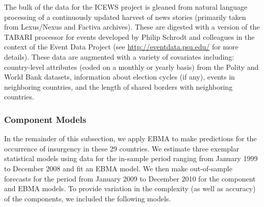 \documentclass[pdftex,12pt,fullpage,oneside]{amsart}
\begin{document}

The bulk of the data for the ICEWS project is gleaned from natural
language processing of a continuously updated harvest of news stories
(primarily taken from Lexus/Nexus and Factiva archives). These are
digested with a version of the TABARI processor for events developed
by Philip Schrodt and colleagues in the context of the Event Data
Project (see \url{http://eventdata.psu.edu/} for more details).  These
data are augmented with a variety of covariates including:
country-level attributes (coded on a monthly or yearly basis) from the
Polity and World Bank datasets, information about election cycles (if
any), events in neighboring countries, and the length of shared
borders with neighboring countries.

\subsubsection{Component Models}

In the remainder of this subsection, we apply EBMA to make predictions
for the occurrence of insurgency in these 29 countries.  We estimate
three exemplar statistical models using data for the in-sample period
ranging from January 1999 to December 2008 and fit an EBMA model.  We
then make out-of-sample forecasts for the period from January 2009 to
December 2010 for the component and EBMA models.  To provide variation
in the complexity (as well as accuracy) of the components, we included
the following models.
\end{document}
